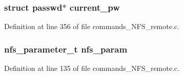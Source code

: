 \subsubsection[{current\_\-pw}]{\setlength{\rightskip}{0pt plus 5cm}struct passwd$\ast$ {\bf current\_\-pw}}\label{commands__NFS__remote_8c_201fd5c4cfc080ec5f144d05be5531b4}




Definition at line 356 of file commands\_\-NFS\_\-remote.c.
\subsubsection[{nfs\_\-param}]{\setlength{\rightskip}{0pt plus 5cm}nfs\_\-parameter\_\-t {\bf nfs\_\-param}}\label{commands__NFS__remote_8c_eb8fc46586993cf210777049fca03969}




Definition at line 135 of file commands\_\-NFS\_\-remote.c.